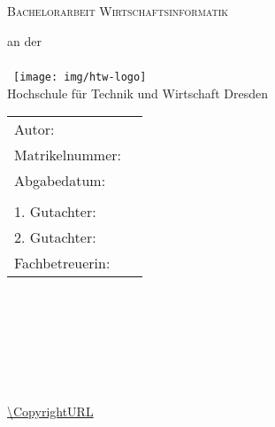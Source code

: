 \begin{titlepage}
\pagestyle{empty}

\hspace{1cm}\\
\,
\vspace{1cm}

\centering

	{
		\scshape
			\Huge \projektname{}
		\par
	}

\vspace{2cm}

{	\scshape	{\LARGE Bachelorarbeit Wirtschaftsinformatik} }

	\vspace{4mm}
	{		\small{an der}\\	}
	\hspace{1mm}\\
	\,
	\vspace{1mm}
	{\texttt{[image: img/htw-logo]}
\\%
	{	\large	Hochschule für Technik und Wirtschaft Dresden\\ }
	}

\vfill
	\vspace{2em}


\begin{tabular}{ll}%
	Autor: & \Author{} \\
	Matrikelnummer: & \AuthorID{} \\
	Abgabedatum: & \DocDate{} \\
	& \\
	1. Gutachter: & \ReviewerA{} \\
	2. Gutachter: & \ReviewerB{} \\
	Fachbetreuerin: & \SupervisorA{} \\
	
\end{tabular}

\par

\newpage

\hspace{1cm}\\
\,
\vspace{1cm}

\par

\vspace{1em}

\par



\vfill

\centering

\RepoURL{} \\ \,\vspace{1.6em}

\CopyrightIMG{}

\Copyright{}\\
\url{\CopyrightURL}

\newpage

\end{titlepage}
